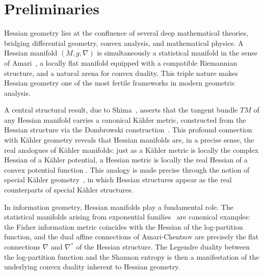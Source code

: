 \section{Preliminaries}

Hessian geometry lies at the confluence of several deep mathematical theories, 
bridging differential geometry, convex analysis, and mathematical physics. 
A Hessian manifold $(M, g, \nabla)$ is simultaneously a statistical manifold 
in the sense of Amari~\citep{amari2000}, a locally flat manifold equipped 
with a compatible Riemannian structure, and a natural arena for convex duality. 
This triple nature makes Hessian geometry one of the most fertile frameworks 
in modern geometric analysis.

A central structural result, due to Shima~\citep{shima2007}, asserts that 
the tangent bundle $TM$ of any Hessian manifold carries a canonical K\"ahler 
metric, constructed from the Hessian structure via the Dombrowski 
construction~\citep{Dombrowski1962,  molitor2025}. This profound connection with K\"ahler 
geometry reveals that Hessian manifolds are, in a precise sense, the real analogues 
of K\"ahler manifolds: just as a K\"ahler metric is locally the complex Hessian of 
a K\"ahler potential, a Hessian metric is locally the real Hessian of a convex 
potential function \citep{danuzia2026}. This analogy is made precise through the notion of special 
K\"ahler geometry~\citep{freed1999, Lu1999}, in which Hessian structures appear as 
the real counterparts of special K\"ahler structures.

In information geometry, Hessian manifolds play a fundamental role. The statistical 
manifolds arising from exponential 
families~\citep{amari2000, nielsen2020} are canonical examples: 
the Fisher information metric coincides with the Hessian of the log-partition 
function, and the dual affine connections of Amari-Chentsov are precisely the 
flat connections $\nabla$ and $\nabla^*$ of the Hessian structure. The Legendre 
duality between the log-partition function and the Shannon entropy is then a 
manifestation of the underlying convex duality inherent to Hessian geometry.

